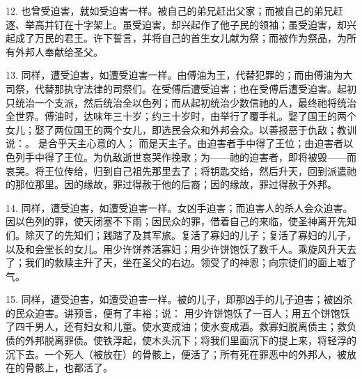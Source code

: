 12. 也曾受迫害，就如受迫害一样。被自己的弟兄赶出父家；而被自己的弟兄赶逐、举高并钉在十字架上。虽受迫害，却兴起作了他子民的领袖；虽受迫害，却兴起成了万民的君王。许下誓言，并将自己的首生女儿献为祭；而被作为祭品，为所有外邦人奉献给圣父。\par

13. 同样，遭受迫害，如遭受迫害一样。由傅油为王，代替犯罪的；而由傅油为大司祭，代替那执守法律的司祭们。在受傅后遭受迫害；也在受傅后遭受迫害。起初只统治一个支派，然后统治全以色列；而从起初统治少数信祂的人，最终祂将统治全世界。傅油时，达味年三十岁；约三十岁时，由举行了覆手礼。娶了国王的两个女儿；娶了两位国王的两个女儿，即选民会众和外邦会众。以善报恶于仇敌；教训说：。 是合乎天主心意的人； 而是天主子。由迫害者手中得了王位；由迫害者以色列手中得了王位。为仇敌逝世哀哭作挽歌；为——祂的迫害者，即将被毁——而哀哭。将王位传给，归到自己祖先那里去了；将钥匙交给，然后升天，回到派遣祂的那位那里。因的缘故，罪过得赦于他的后裔；因的缘故，罪过得赦于外邦。\par

14. 同样，遭受迫害，如遭受迫害一样。女凶手迫害；而迫害人的杀人会众迫害。因以色列的罪，使天闭塞不下雨；因民众的罪，借着自己的来临，使圣神离开先知们。除灭了的先知们；践踏了及其军旅。复活了寡妇的儿子；复活了寡妇的儿子，以及和会堂长的女儿。用少许饼养活寡妇；用少许饼饱饫了数千人。乘旋风升天去了；我们的救赎主升了天，坐在圣父的右边。领受了的神恩；向宗徒们的面上嘘了气。\par

15. 同样，遭受迫害，如遭受迫害一样。被的儿子，即那凶手的儿子迫害；被凶杀的民众迫害。讲预言，便有了丰裕；说： 用少许饼饱饫了一百人；用五个饼饱饫了四千男人，还有妇女和儿童。使水变成油；使水变成酒。救寡妇脱离债主；救负债的外邦脱离罪债。使铁浮起，使木头沉下；将我们里面沉下的提上来，将轻浮的沉下去。一个死人（被放在）的骨骸上，便活了；所有死在罪恶中的外邦人，被放在的骨骸上，也都活了。\par

